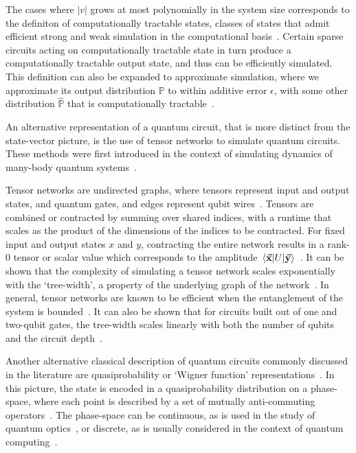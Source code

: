 The cases where $\left|v\right|$ grows at most polynomially in the system size corresponds to the definiton of computationally tractable states, classes of states that admit efficient strong and weak simulation in the computational basis~\cite{VandenNest2009}. Certain sparse circuits acting on computationally tractable state in turn produce a computationally tractable output state, and thus can be efficiently simulated. This definition can also be expanded to approximate simulation, where we approximate its output distribution $\mathbb{P}$ to within additive error $\epsilon$, with some other distribution $\mathbb{\hat{P}}$ that is computationally tractable~\cite{Schwarz2013}.\par
An alternative representation of a quantum circuit, that is more distinct from the state-vector picture, is the use of tensor networks to simulate quantum circuits. These methods were first introduced in the context of simulating dynamics of many-body quantum systems~\cite{Vidal2003}.\par
Tensor networks are undirected graphs, where tensors represent input and output states, and quantum gates, and edges represent qubit wires~\cite{Markov2005}. Tensors are combined or contracted by summing over shared indices, with a runtime that scales as the product of the dimensions of the indices to be contracted. For fixed input and output states $x$ and $y$, contracting the entire network results in a rank-0 tensor or scalar value which corresponds to the amplitude $\matrixel{\va{x}}{U}{\va{y}}$~\cite{Markov2005}. It can be shown that the complexity of simulating a tensor network scales exponentially with the `tree-width', a property of the underlying graph of the network~\cite{Markov2005}. In general, tensor networks are known to be efficient when the entanglement of the system is bounded~\cite{Vidal2003}. It can also be shown that for circuits built out of one and two-qubit gates, the tree-width scales linearly with both the number of qubits and the circuit depth~\cite{Markov2005}.\par
Another alternative classical description of quantum circuits commonly discussed in the literature are quasiprobability or `Wigner function' representations~\cite{Wootters1987}. In this picture, the state is encoded in a quasiprobability distribution on a phase-space, where each point is described by a set of mutually anti-commuting operators~\cite{Wootters1987}. The phase-space can be continuous, as is used in the study of quantum optics~\cite{Nielsen2000}, or discrete, as is usually considered in the context of quantum computing~\cite{Gross2006}.\par

